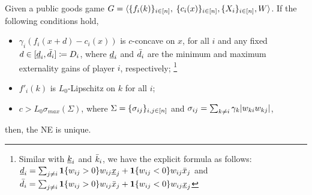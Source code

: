 \begin{theorem}
\label{thm:NE:unique:near-individual}
Given a public goods game $G = \langle \{f_i(k)\}_{i\in[n]},$ $\{c_i(x)\}_{i\in[n]}, \{X_i\}_{i\in[n]}, W \rangle$. If the following conditions hold, 
\begin{itemize}
    \item[(1)] $\gamma_i \left( f_i(x + d) - c_i(x) \right)$ is $c$-concave on $x$, for all $i$ and any fixed $d \in [\underline{d}_i, \bar{d}_i] \coloneqq D_i$, where $\underline{d}_i$ and $\bar{d}_i$ are the minimum and maximum externality gains of player $i$, respectively; \footnote{Similar with $\underline{k}_i$ and $\bar{k}_i$, we have the explicit formula as follows: $\underline{d}_i = \sum_{j\ne i} \bm{1}\{w_{ij} > 0\} w_{ij} \underline{x}_j + \bm{1}\{w_{ij} < 0\} w_{ij} \bar{x}_j$ and $\bar{d}_i = \sum_{j\ne i} \bm{1}\{w_{ij} > 0\} w_{ij} \bar{x}_j + \bm{1}\{w_{ij} < 0\} w_{ij} \underline{x}_j$}
    \item[(2)] $f'_i(k)$ is $L_0$-Lipschitz on $k$ for all $i$;
    \item[(3)] $c > L_0 \sigma_{max}(\Sigma)$, where $\Sigma = \{\sigma_{ij}\}_{i,j\in[n]}$ and $\sigma_{ij} = \sum_{k\ne i} \gamma_k | w_{ki}w_{kj} |$,
\end{itemize}
then, the NE is unique.
\end{theorem}